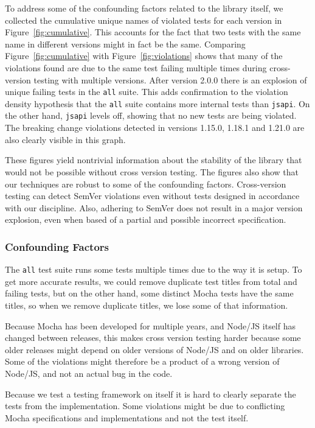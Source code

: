 To address some of the confounding factors related to the library
itself, we collected the cumulative unique names of violated tests
for each version in Figure~\ref{fig:cumulative}. This accounts for the
fact that two tests with the same name in different versions might in
fact be the same.
%
Comparing Figure~\ref{fig:cumulative} with Figure~\ref{fig:violations}
shows that many of the violations found are due to the same test
failing multiple times during cross-version testing with multiple
versions.
%
After version 2.0.0 there is an explosion of unique failing tests in
the {\tt all} suite. 
%
This adds confirmation to the violation density hypothesis that the
{\tt all} suite contains more internal tests than {\tt jsapi}.
%
On the other hand, {\tt jsapi} levels off, showing that no new tests
are being violated.
%
The breaking change violations detected in versions 1.15.0, 1.18.1 and
1.21.0 are also clearly visible in this graph.

These figures yield nontrivial information about the stability of the
library that would not be possible without cross version testing. The
figures also show that our techniques are robust to some of the
confounding factors. Cross-version testing can detect SemVer
violations even without tests designed in accordance with our
discipline. Also, adhering to SemVer does not result in a major version
explosion, even when based of a partial and possible incorrect
specification.

\subsubsection{Confounding Factors}

The {\tt all} test suite runs some tests multiple times due to the
way it is setup. To get more accurate results, we could remove
duplicate test titles from total and failing tests, but on the other
hand, some distinct Mocha tests have the same titles, so when we
remove duplicate titles, we lose some of that information. 

Because Mocha has been developed for multiple years, and Node/JS itself
has changed between releases, this makes cross version testing harder
because some older releases might depend on older versions of Node/JS and
on older libraries. Some of the violations might therefore be a product
of a wrong version of Node/JS, and not an actual bug in the code. 

Because we test a testing framework on itself it is hard to clearly
separate the tests from the implementation. Some violations might be 
due to conflicting Mocha specifications and implementations and not
the test itself.

